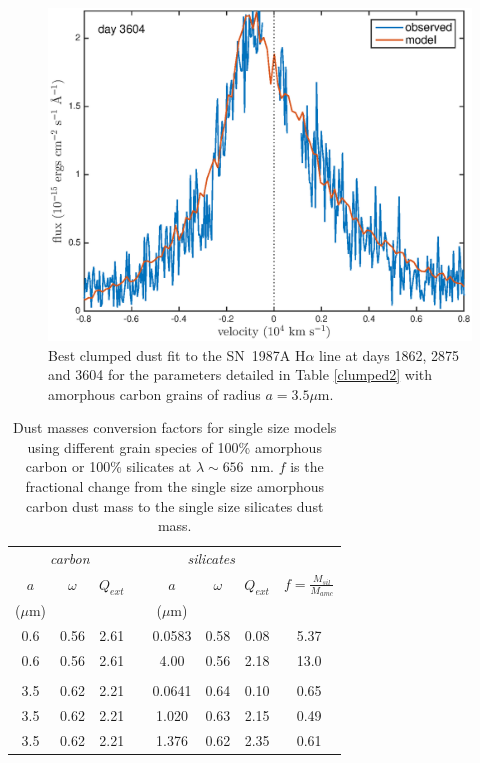 \documentclass[useAMS,usenatbib,usegraphicx]{mnras}
\begin{document}
\begin{figure}
\includegraphics[trim =55 10 45 15,clip=true,scale=0.35]{clump_1/maximum/d3604Ha}
\caption{Best clumped dust fit to the SN~1987A  H$\alpha$ line at days 1862, 2875 and 
3604 for the parameters detailed in Table \ref{clumped2} with amorphous carbon grains of radius $a=3.5\mu$m.}
\label{d1862_3604_cmax}

\end{figure}

\begin{table}
	\caption{Dust masses conversion factors for single size models using different grain species of 100\% amorphous carbon or 100\% silicates at $\lambda \sim 656$~nm. $f$ is the fractional change from the single size amorphous carbon dust mass to the single size silicates dust mass.}
	\label{tb_sil}
	\begin{center}
  	\begin{tabular}{@{} cccccccc @{}}
    	\hline
	\multicolumn{3}{c}{\textit{carbon}} && \multicolumn{3}{c}{\textit{silicates}} & \\
$a$ &$\omega$ &  $Q_{ext}$ & &$a$&$\omega$ & $Q_{ext}$ & $f=\frac{M_{sil}}{M_{amc}}$ \\
($\mu$m) &&&&($\mu$m)\\
\hline
0.6 & 0.56 & 2.61 & &0.0583 & 0.58 &0.08 & 5.37 \\
0.6 &0.56 & 2.61 & &4.00 & 0.56 & 2.18 & 13.0 \\
 \\
3.5 & 0.62 &2.21 & &0.0641 & 0.64 & 0.10 & 0.65 \\
3.5 & 0.62 &2.21 & &1.020 & 0.63 & 2.15 & 0.49 \\
3.5 & 0.62 & 2.21 & &1.376 & 0.62 & 2.35 & 0.61 \\


    \hline
  \end{tabular}
  \end{center}
\end{table}
\end{document}
